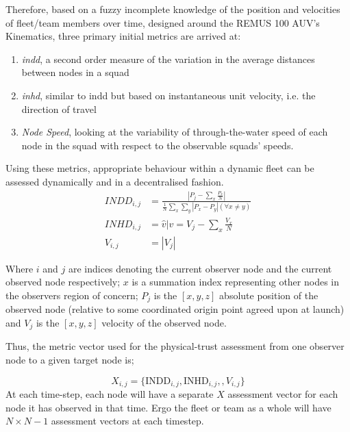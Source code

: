 Therefore, based on a fuzzy incomplete knowledge of the position and velocities of fleet/team members over time, designed around the REMUS 100 AUV’s Kinematics, three primary initial metrics are arrived at:
\pagebreak
\begin{enumerate}
\item \emph{\acrfull{indd}}, a second order measure of the variation in the average distances between nodes in a squad
\item \emph{\acrfull{inhd}}, similar to \gls{indd} but based on instantaneous unit velocity, i.e. the direction of travel
\item \emph{Node Speed}, looking at the variability of through-the-water speed of each node in the squad with respect to the observable squads’ speeds.
\end{enumerate}
Using these metrics, appropriate behaviour within a dynamic fleet can be assessed dynamically and in a decentralised fashion.
\begin{align}
INDD_{i,j} &= \frac{|P_j - \sum_x \frac{P_x}{N}|}{\frac{1}{N}\sum_x \sum_y{|P_x - P_y| (\forall x \neq y)}}\\
INHD_{i,j} &= \hat{v} \vert v= V_j - \sum_x{\frac{V_x}{N}}\\
V_{i,j} &= |V_j|
\end{align}

Where $i$ and $j$ are indices denoting the current observer node and the current observed node respectively; $x$ is a summation index representing other nodes in the observers region of concern; $P_{j}$ is the $[x,y,z]$ absolute position of the observed node (relative to some coordinated origin point agreed upon at launch) and $V_{j}$ is the $[x,y,z]$ velocity of the observed node.


Thus, the metric vector used for the physical-trust assessment from one observer node to a given target node is;

\begin{equation}
X_{i,j}=\{\text{INDD}_{i,j}, \text{INHD}_{i,j},, V_{i,j}\}
\label{eq:phys_vector}
\end{equation}
At each time-step, each node will have a separate $X$ assessment vector for each node it has observed in that time. 
Ergo the fleet or team as a whole will have $N\times N-1$ assessment vectors at each timestep.

